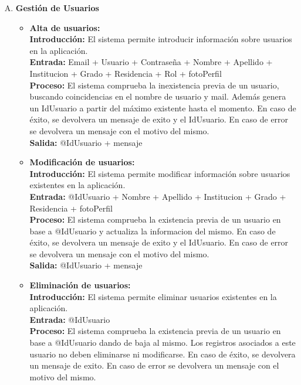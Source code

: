     \begin{enumerate}[A.]
      \item \textbf{Gestión de Usuarios}
        \begin{itemize}  
          \item \textbf{Alta de usuarios:}
            \\ \textbf{Introducción:} El sistema permite introducir información sobre usuarios en la aplicación.
            \\ \textbf{Entrada:} Email + Usuario + Contraseña + Nombre + Apellido + Institucion + Grado + Residencia + Rol + fotoPerfil
            \\ \textbf{Proceso:} El sistema comprueba la inexistencia previa de un usuario, buscando coincidencias en el nombre de usuario y mail. Además genera un IdUsuario a partir del máximo existente hasta el momento. En caso de éxito, se devolvera un mensaje de exito y el IdUsuario. En caso de error se devolvera un mensaje con el motivo del mismo.
            \\ \textbf{Salida:} @IdUsuario + mensaje
            \\
          \item \textbf{Modificación de usuarios:}
            \\ \textbf{Introducción:} El sistema permite modificar información sobre usuarios existentes en la aplicación.
            \\ \textbf{Entrada:} @IdUsuario + Nombre + Apellido + Institucion + Grado + Residencia + fotoPerfil
            \\ \textbf{Proceso:} El sistema comprueba la existencia previa de un usuario en base a @IdUsuario y actualiza la informacion del mismo. En caso de éxito, se devolvera un mensaje de exito y el IdUsuario. En caso de error se devolvera un mensaje con el motivo del mismo.
            \\ \textbf{Salida:} @IdUsuario + mensaje
            \\
          \item \textbf{Eliminación de usuarios:}
            \\ \textbf{Introducción:} El sistema permite eliminar usuarios existentes en la aplicación.
            \\ \textbf{Entrada:} @IdUsuario
            \\ \textbf{Proceso:} El sistema comprueba la existencia previa de un usuario en base a @IdUsuario dando de baja al mismo. Los registros asociados a este usuario no deben eliminarse ni modificarse. En caso de éxito, se devolvera un mensaje de exito. En caso de error se devolvera un mensaje con el motivo del mismo.

\end{itemize}
\end{enumerate}
